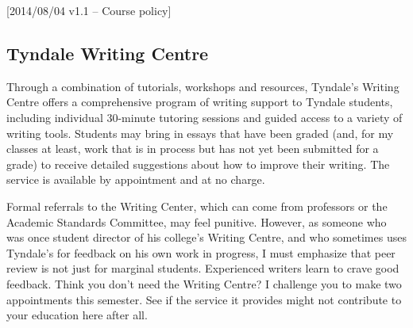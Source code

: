 [2014/08/04 v1.1 -- Course policy]

\subsection{Tyndale Writing Centre}
\label{writing_centre}

Through a combination of tutorials, workshops and resources, Tyndale's Writing
Centre offers a comprehensive program of writing support to Tyndale students,
including individual 30-minute tutoring sessions and guided access to a variety
of writing tools. Students may bring in essays that have been graded (and, for
my classes at least, work that is in process but has not yet been submitted for
a grade) to receive detailed suggestions about how to improve their writing. The
service is available by appointment and at no charge.

Formal referrals to the Writing Center, which can come from professors or the
Academic Standards Committee, may feel punitive. However, as someone who was
once student director of his college's Writing Centre, and who sometimes uses
Tyndale's for feedback on his own work in progress, I must emphasize that peer
review is not just for marginal students. Experienced writers learn to crave
good feedback. Think you don't need the Writing Centre? I challenge you to make
two appointments this semester. See if the service it provides might not
contribute to your education here after all.